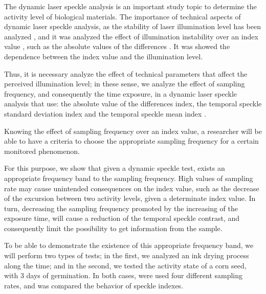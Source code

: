 \documentclass[review]{elsarticle}
\begin{document}
The dynamic laser speckle analysis is  an important
study topic\cite{catalano2019viability,rivera2019sound,gonzalez2018diode,Silva2018,braga2017dynamic} 
to determine the  activity level of biological materials. 
The importance of technical aspects of dynamic laser speckle analysis,
as the stability of laser illumination level has been  analyzed \cite{gonzalez2018diode}, 
and it was analyzed the effect of illumination instability over an index value \cite{gonzalez2018diode},
such as the absolute values of the differences \cite{cardoso2014,rivera2017selection}.
It  was showed the dependence between the index value and the illumination level. 

Thus, 
it is necessary analyze the effect of technical parameters that affect the perceived illumination level; 
in these sense,
we analyze the effect of sampling frequency, 
and consequently the time exposure, in a dynamic laser speckle analysis
that use: the absolute value of the differences index, 
the temporal speckle standard deviation index and the temporal speckle mean index \cite{Nothdurft:05}. 

Knowing the effect of sampling frequency over an index value,
a researcher will be able to have a criteria to choose the appropriate sampling frequency 
for a certain monitored phenomenon. 

For this purpose, we show that given a dynamic speckle test, exists an appropriate frequency band
to the sampling frequency. High values of sampling rate may cause unintended consequences on the index value, 
such as the decrease of the excursion between two activity levels, given a determinate index value. 
In turn, decreasing the sampling frequency promoted by the increasing of the exposure time,
will cause a reduction of the temporal speckle contrast,
 and consequently limit the possibility  to get information from the sample.  

To be able to demonstrate the existence of this appropriate frequency band,
we will perform two types of tests; in the first, we analyzed an ink drying process along the time; and in
the second, we tested the activity state of a corn seed, with 3 days of germination.
In both cases, were used four different sampling rates, 
and was compared the behavior of speckle indexes.
\end{document}
